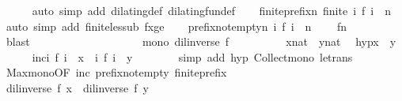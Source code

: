 \begin{isabellebody}
\ \ \ \ \isamarkupfalse%
\ {\isacharparenleft}auto\ simp\ add{\isacharcolon}\ dilating{\isacharunderscore}def\ dilating{\isacharunderscore}fun{\isacharunderscore}def{\isacharparenright}\isanewline
\ \ \isamarkupfalse%
\ finite{\isacharunderscore}prefix{\isacharcolon}{\isacartoucheopen}{\isasymAnd}n{\isachardot}\ finite\ {\isacharbraceleft}i{\isachardot}\ f\ i\ {\isasymle}\ n{\isacharbraceright}{\isacartoucheclose}\ \isamarkupfalse%
\ {\isacharparenleft}auto\ simp\ add{\isacharcolon}\ finite{\isacharunderscore}less{\isacharunderscore}ub\ fxge{\isacharparenright}\isanewline
\ \ \isamarkupfalse%
\ prefix{\isacharunderscore}not{\isacharunderscore}empty{\isacharcolon}{\isacartoucheopen}{\isasymAnd}n{\isachardot}\ {\isacharbraceleft}i{\isachardot}\ f\ i\ {\isasymle}\ n{\isacharbraceright}\ {\isasymnoteq}\ {\isacharbraceleft}{\isacharbraceright}{\isacartoucheclose}\ \isamarkupfalse%
\ f{}n\ \isamarkupfalse%
\ blast\ \ \ \ \ \ \ \ \ \ \ \ \ \ \ \ \isanewline
\isanewline
\ \ \isamarkupfalse%
\ {}{\isacharcolon}{\isacartoucheopen}mono\ {\isacharparenleft}dil{\isacharunderscore}inverse\ f{\isacharparenright}{\isacartoucheclose}\isanewline
\ \ \isamarkupfalse%
\ {\isacharminus}\isanewline
\ \ \isacommand{{\isacharbraceleft}}\isamarkupfalse%
\ \isamarkupfalse%
\ x{\isacharcolon}{\isacharcolon}{\isacartoucheopen}nat{\isacartoucheclose}\ \ y{\isacharcolon}{\isacharcolon}{\isacartoucheopen}nat{\isacartoucheclose}\ \isamarkupfalse%
\ hyp{\isacharcolon}{\isacartoucheopen}x\ {\isasymle}\ y{\isacartoucheclose}\isanewline
\ \ \ \ \isamarkupfalse%
\ inc{\isacharcolon}{\isacartoucheopen}{\isacharbraceleft}i{\isachardot}\ f\ i\ {\isasymle}\ x{\isacharbraceright}\ {\isasymsubseteq}\ {\isacharbraceleft}i{\isachardot}\ f\ i\ {\isasymle}\ y{\isacharbraceright}{\isacartoucheclose}\isanewline
\ \ \ \ \ \ \isamarkupfalse%
\ {\isacharparenleft}simp\ add{\isacharcolon}\ hyp\ Collect{\isacharunderscore}mono\ le{\isacharunderscore}trans{\isacharparenright}\isanewline
\ \ \ \ \isamarkupfalse%
\ Max{\isacharunderscore}mono{\isacharbrackleft}OF\ inc\ prefix{\isacharunderscore}not{\isacharunderscore}empty\ finite{\isacharunderscore}prefix{\isacharbrackright}\isanewline
\ \ \ \ \ \ \isamarkupfalse%
\ {\isacartoucheopen}{\isacharparenleft}dil{\isacharunderscore}inverse\ f{\isacharparenright}\ x\ {\isasymle}\ {\isacharparenleft}dil{\isacharunderscore}inverse\ f{\isacharparenright}\ y{\isacartoucheclose}\ \isamarkupfalse%

\end{isabellebody}
